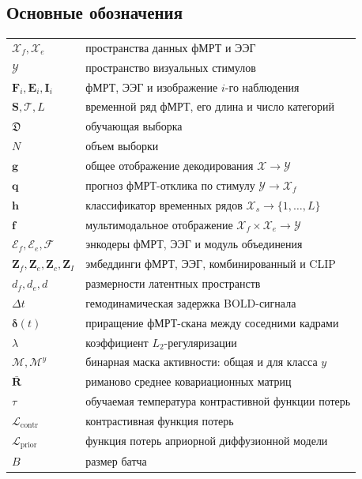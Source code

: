\subsection*{Основные обозначения}
\begin{tabular}{p{}p{}}
$\mathcal{X}_f, \mathcal{X}_e$ & пространства данных фМРТ и ЭЭГ \\
$\mathcal{Y}$ & пространство визуальных стимулов \\
$\mathbf{F}_i, \mathbf{E}_i, \mathbf{I}_i$ & фМРТ, ЭЭГ и изображение $i$-го наблюдения \\
$\mathbf{S}, \mathcal{T}, L$ & временной ряд фМРТ, его длина и число категорий \\
$\mathfrak{D}$ & обучающая выборка \\
$N$ & объем выборки \\
$\mathbf{g}$ & общее отображение декодирования $\mathcal{X} \to \mathcal{Y}$ \\
$\mathbf{q}$ & прогноз фМРТ-отклика по стимулу $\mathcal{Y} \to \mathcal{X}_f$ \\
$\mathbf{h}$ & классификатор временных рядов $\mathcal{X}_s \to \{1, \ldots, L\}$ \\
$\mathbf{f}$ & мультимодальное отображение $\mathcal{X}_f \times \mathcal{X}_e \to \mathcal{Y}$ \\
$\mathcal{E}_f, \mathcal{E}_e, \mathcal{F}$ & энкодеры фМРТ, ЭЭГ и модуль объединения \\
$\mathbf{Z}_f, \mathbf{Z}_e, \mathbf{Z}_c, \mathbf{Z}_I$ & эмбеддинги фМРТ, ЭЭГ, комбинированный и CLIP \\
$d_f, d_e, d$ & размерности латентных пространств \\
$\Delta t$ & гемодинамическая задержка BOLD-сигнала \\
$\boldsymbol{\delta}(t)$ & приращение фМРТ-скана между соседними кадрами \\
$\lambda$ & коэффициент $L_2$-регуляризации \\
$\mathcal{M}, \mathcal{M}^{y}$ & бинарная маска активности: общая и для класса $y$ \\
$\bar{\mathbf{R}}$ & риманово среднее ковариационных матриц \\
$\tau$ & обучаемая температура контрастивной функции потерь \\
$\mathcal{L}_{\text{contr}}$ & контрастивная функция потерь \\
$\mathcal{L}_{\text{prior}}$ & функция потерь априорной диффузионной модели \\
$B$ & размер батча \\
\end{tabular}
